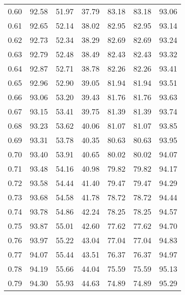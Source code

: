 \begin{tabular}{|c|c|c|c|c|c|c|}
      0.60 &     92.58 &     51.97 &      37.79 &   83.18 &      83.18 &         93.06 \\
      0.61 &     92.65 &     52.14 &      38.02 &   82.95 &      82.95 &         93.14 \\
      0.62 &     92.73 &     52.34 &      38.29 &   82.69 &      82.69 &         93.24 \\
      0.63 &     92.79 &     52.48 &      38.49 &   82.43 &      82.43 &         93.32 \\
      0.64 &     92.87 &     52.71 &      38.78 &   82.26 &      82.26 &         93.41 \\
      0.65 &     92.96 &     52.90 &      39.05 &   81.94 &      81.94 &         93.51 \\
      0.66 &     93.06 &     53.20 &      39.43 &   81.76 &      81.76 &         93.63 \\
      0.67 &     93.15 &     53.41 &      39.75 &   81.39 &      81.39 &         93.74 \\
      0.68 &     93.23 &     53.62 &      40.06 &   81.07 &      81.07 &         93.85 \\
      0.69 &     93.31 &     53.78 &      40.35 &   80.63 &      80.63 &         93.95 \\
      0.70 &     93.40 &     53.91 &      40.65 &   80.02 &      80.02 &         94.07 \\
      0.71 &     93.48 &     54.16 &      40.98 &   79.82 &      79.82 &         94.17 \\
      0.72 &     93.58 &     54.44 &      41.40 &   79.47 &      79.47 &         94.29 \\
      0.73 &     93.68 &     54.58 &      41.78 &   78.72 &      78.72 &         94.44 \\
      0.74 &     93.78 &     54.86 &      42.24 &   78.25 &      78.25 &         94.57 \\
      0.75 &     93.87 &     55.01 &      42.60 &   77.62 &      77.62 &         94.70 \\
      0.76 &     93.97 &     55.22 &      43.04 &   77.04 &      77.04 &         94.83 \\
      0.77 &     94.07 &     55.44 &      43.51 &   76.37 &      76.37 &         94.97 \\
      0.78 &     94.19 &     55.66 &      44.04 &   75.59 &      75.59 &         95.13 \\
      0.79 &     94.30 &     55.93 &      44.63 &   74.89 &      74.89 &         95.29 \\

\end{tabular}
